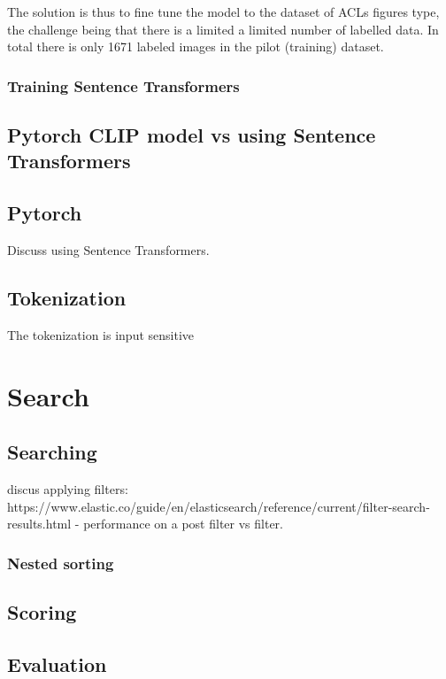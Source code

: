 \documentclass[article, 10pt]{article}
\begin{document}
The solution is thus to fine tune the model to the dataset of ACLs figures type, the challenge being that there is a limited 
a limited number of labelled data. In total there is only 1671 labeled images in the pilot (training) dataset. 


\subsubsection{Training Sentence Transformers}


\subsection{Pytorch CLIP model vs using Sentence Transformers }


\subsection{Pytorch} 
Discuss using Sentence Transformers. 

\subsection{Tokenization} 
The tokenization is input sensitive


\section{Search}
\subsection{Searching}
discus applying filters: https://www.elastic.co/guide/en/elasticsearch/reference/current/filter-search-results.html
  - performance on a post filter vs filter.
\subsubsection{Nested sorting}
\subsection{Scoring}

\subsection{Evaluation}


\end{document}
